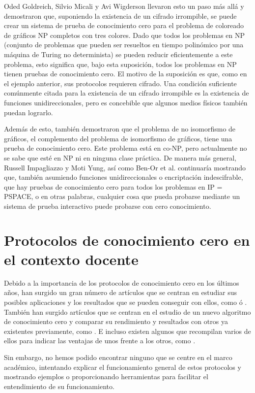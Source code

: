 Oded Goldreich, Silvio Micali y Avi Wigderson llevaron esto un paso más allá y demostraron que, suponiendo la existencia de un cifrado irrompible, se puede crear un sistema de prueba de conocimiento cero para el problema de coloreado de gráficos NP completos con tres colores. Dado que todos los problemas en NP (conjunto de problemas que pueden ser resueltos en tiempo polinómico por una máquina de Turing no determinista) se pueden reducir eficientemente a este problema, esto significa que, bajo esta suposición, todos los problemas en NP tienen pruebas de conocimiento cero. El motivo de la suposición es que, como en el ejemplo anterior, sus protocolos requieren cifrado. Una condición suficiente comúnmente citada para la existencia de un cifrado irrompible es la existencia de funciones unidireccionales, pero es concebible que algunos medios físicos también puedan lograrlo.

Además de esto, también demostraron que el problema de no isomorfismo de gráficos, el complemento del problema de isomorfismo de gráficos, tiene una prueba de conocimiento cero. Este problema está en co-NP, pero actualmente no se sabe que esté en NP ni en ninguna clase práctica. De manera más general, Russell Impagliazzo y Moti Yung, así como Ben-Or et al. continuaría mostrando que, también asumiendo funciones unidireccionales o encriptación indescifrable, que hay pruebas de conocimiento cero para todos los problemas en IP = PSPACE, o en otras palabras, cualquier cosa que pueda probarse mediante un sistema de prueba interactivo puede probarse con cero conocimiento.

\section{Protocolos de conocimiento cero en el contexto docente}

Debido a la importancia de los protocolos de conocimiento cero en los últimos años, han surgido un gran número de artículos que se centran en estudiar sus posibles aplicaciones y los resultados que se pueden conseguir con ellos, como \cite{Bulletproofs} ó \cite{Bulletproofs2}. También han surgido artículos que se centran en el estudio de un nuevo algoritmo de conocimiento cero y comparar su rendimiento y resultados con otros ya existentes previamente, como \cite{Sharp}. E incluso existen algunos que recompilan varios de ellos para indicar las ventajas de unos frente a los otros, como \cite{Survey}.

Sin embargo, no hemos podido encontrar ninguno que se centre en el marco académico, intentando explicar el funcionamiento general de estos protocolos y mostrando ejemplos o proporcionando herramientas para facilitar el entendimiento de su funcionamiento.

